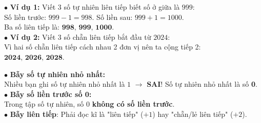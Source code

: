 \documentclass[14pt,a4paper,oneside]{extbook}
\begin{document}
\vspace{2mm}

\noindent
\begin{minipage}[t]{0.53\textwidth}
  \begin{tcolorbox}[
    enhanced,
    title={\footnotesize\bfseries\color{white}\faCheckCircle\ Ví dụ thực hành chuẩn mực},
    colback=green!2!white,
    colframe=green!60!black,
    arc=2.5mm, boxrule=0.8pt, top=1.8mm, bottom=1.8mm, left=2.2mm, right=2.2mm
  ]
    \footnotesize
    $\bullet$ \textbf{Ví dụ 1:} Viết 3 số tự nhiên liên tiếp biết số ở giữa là $999$:\\
    Số liền trước: $999 - 1 = 998$. Số liền sau: $999 + 1 = 1000$.\\
    Ba số liên tiếp là: $\mathbf{998,\, 999,\, 1000}$.\\
    $\bullet$ \textbf{Ví dụ 2:} Viết 3 số chẵn liên tiếp bắt đầu từ $2024$:\\
    Vì hai số chẵn liên tiếp cách nhau 2 đơn vị nên ta cộng tiếp 2:\\
    $\mathbf{2024,\, 2026,\, 2028}$.
  \end{tcolorbox}
\end{minipage}%
\hfill
\begin{minipage}[t]{0.45\textwidth}
  \begin{tcolorbox}[
    enhanced,
    title={\footnotesize\bfseries\color{white}\faExclamationTriangle\ Mẹo tránh bẫy trắc nghiệm},
    colback=red!2!white,
    colframe=red!70!black,
    arc=2.5mm, boxrule=0.8pt, top=1.8mm, bottom=1.8mm, left=2.2mm, right=2.2mm
  ]
    \footnotesize
    $\bullet$ \textbf{Bẫy số tự nhiên nhỏ nhất:}\\
    Nhiều bạn ghi số tự nhiên nhỏ nhất là $1$ $\rightarrow$ \textbf{SAI}! Số tự nhiên nhỏ nhất là số \textbf{0}.\\
    $\bullet$ \textbf{Bẫy số liền trước số 0:}\\
    Trong tập số tự nhiên, số 0 \textbf{không có số liền trước}.\\
    $\bullet$ \textbf{Bẫy liên tiếp}: Phải đọc kĩ là "liên tiếp" ($+1$) hay "chẵn/lẻ liên tiếp" ($+2$).
  \end{tcolorbox}
\end{minipage}
\end{document}
